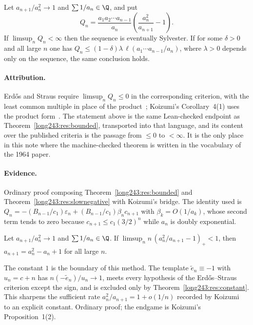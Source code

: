 \begin{theorem}\label{long243:res:strausbounded}
Let $a_{n+1}/a_n^2\to1$ and $\sum1/a_n\in\Q$, and put
\[
 Q_n=\frac{a_1a_2\cdots a_{n-1}}{a_n}
     \left(\frac{a_n^2}{a_{n+1}}-1\right).
\]
If $\limsup_nQ_n<\infty$ then the sequence is eventually Sylvester.  If for
some $\delta>0$ and all large $n$ one has
$Q_n\le(1-\delta)\lambda\,\ell(a_1\cdots a_{n-1}/a_n)$, where $\lambda>0$
depends only on the sequence, the same conclusion holds.
\end{theorem}

\paragraph{Attribution.}
Erd\H{o}s and Straus require $\limsup_nQ_n\le0$ in the corresponding criterion,
with the least common multiple in place of the product~\cite[Theorem~3,
p.~132]{erdosstraus1964}; Koizumi's Corollary~4(1) uses the product
form~\cite[Cor.~4(1), pp.~14--15]{koizumi2025}.  The statement above is the same
Lean-checked endpoint as Theorem~\ref{long243:res:bounded}, transported into that
language, and its content over the published criteria is the passage from
$\le0$ to $<\infty$.  It is the only place in this note where the machine-checked
theorem is written in the vocabulary of the 1964 paper.

\paragraph{Evidence.}
Ordinary proof composing Theorem~\ref{long243:res:bounded} and
Theorem~\ref{long243:res:slownegative} with Koizumi's bridge.  The identity used is
$Q_n=-(B_{n-1}/c_1)\varepsilon_n+(B_{n-1}/c_1)\beta_nc_{n+1}$ with
$\beta_k=O(1/a_k)$, whose second term tends to zero because $c_{n+1}\le
c_1(3/2)^n$ while $a_n$ is doubly exponential.

\begin{theorem}\label{long243:res:onethreshold}
Let $a_{n+1}/a_n^2\to1$ and $\sum1/a_n\in\Q$.  If
$\limsup_n n\,(a_n^2/a_{n+1}-1)_+<1$, then $a_{n+1}=a_n^2-a_n+1$ for all large
$n$.
\end{theorem}

\noindent The constant $1$ is the boundary of this method.  The template
$\tilde e_n\equiv-1$ with $u_n=c+n$ has $n(-\tilde e_n)/u_n\to1$, meets
every hypothesis of the Erd\H{o}s--Straus criterion except the sign, and is
excluded only by Theorem~\ref{long243:res:constant}.  This sharpens the sufficient rate
$a_n^2/a_{n+1}=1+o(1/n)$ recorded by Koizumi~\cite[Remark~3, p.~16]{koizumi2025} to an explicit constant.  Ordinary proof; the endgame is
Koizumi's Proposition~1(2).


